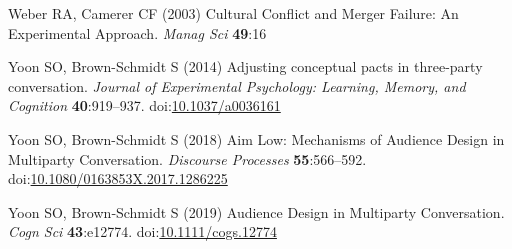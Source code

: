 \documentclass[
  english,
  a4paper,
]{article}
\newlength{\cslhangindent}
\newlength{\cslentryspacingunit} %
\newenvironment{CSLReferences}[2] %
 {%
  \setlength{\parindent}{0pt}
  \ifodd #1
  \let\oldpar\par
  \def\par{\hangindent=\cslhangindent\oldpar}
  \fi
  \setlength{\parskip}{#2\cslentryspacingunit}
 }%
 {}
\begin{document}
\begin{CSLReferences}{1}{0}
\leavevmode{}%
Weber RA, Camerer CF (2003) Cultural {Conﬂict} and {Merger Failure}: {An Experimental Approach}. \emph{Manag Sci} \textbf{49}:16

\leavevmode{}%
Yoon SO, Brown-Schmidt S (2014) Adjusting conceptual pacts in three-party conversation. \emph{Journal of Experimental Psychology: Learning, Memory, and Cognition} \textbf{40}:919--937. doi:\href{https://doi.org/10.1037/a0036161}{10.1037/a0036161}

\leavevmode{}%
Yoon SO, Brown-Schmidt S (2018) Aim {Low}: {Mechanisms} of {Audience Design} in {Multiparty Conversation}. \emph{Discourse Processes} \textbf{55}:566--592. doi:\href{https://doi.org/10.1080/0163853X.2017.1286225}{10.1080/0163853X.2017.1286225}

\leavevmode{}%
Yoon SO, Brown‐Schmidt S (2019) Audience {Design} in {Multiparty Conversation}. \emph{Cogn Sci} \textbf{43}:e12774. doi:\href{https://doi.org/10.1111/cogs.12774}{10.1111/cogs.12774}

\end{CSLReferences}
\end{document}

